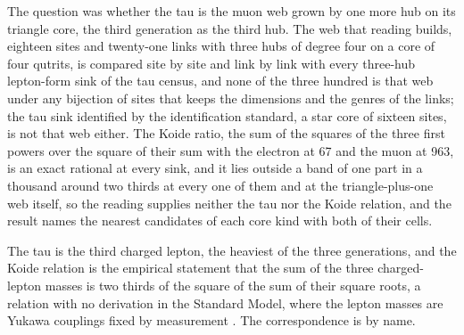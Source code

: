 The question was whether the tau is the muon web grown by one more hub on its triangle core, the third generation as the third hub. The web that reading builds, eighteen sites and twenty-one links with three hubs of degree four on a core of four qutrits, is compared site by site and link by link with every three-hub lepton-form sink of the tau census, and none of the three hundred is that web under any bijection of sites that keeps the dimensions and the genres of the links; the tau sink identified by the identification standard, a star core of sixteen sites, is not that web either. The Koide ratio, the sum of the squares of the three first powers over the square of their sum with the electron at 67 and the muon at 963, is an exact rational at every sink, and it lies outside a band of one part in a thousand around two thirds at every one of them and at the triangle-plus-one web itself, so the reading supplies neither the tau nor the Koide relation, and the result names the nearest candidates of each core kind with both of their cells.
\begin{chbridge}
The tau is the third charged lepton, the heaviest of the three generations, and the Koide relation is the empirical statement that the sum of the three charged-lepton masses is two thirds of the square of the sum of their square roots, a relation with no derivation in the Standard Model, where the lepton masses are Yukawa couplings fixed by measurement \cite{Koide1983,Weinberg1995}. The correspondence is by name.
\end{chbridge}
